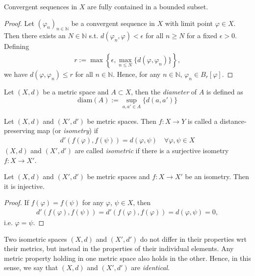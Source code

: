 \begin{theorem}
	Convergent sequences in $X$ are fully contained in a bounded subset.
\end{theorem}

\begin{proof}
	Let $(\varphi_n)_{n\in\mathbb N}$ be a convergent sequence in $X$ with limit point $\varphi\in X$. Then there exists an $N\in\mathbb N$ s.t. $d(\varphi_n, \varphi) < \epsilon$ for all $n\geq N$ for a fixed $\epsilon > 0$. Defining
	\begin{align}
		r := \max \left\{ \epsilon, \max_{n \leq N}\{d(\varphi, \varphi_n)\} \right\},
	\end{align}
	we have $d(\varphi, \varphi_n) \leq r$ for all $n\in\mathbb N$. Hence, for any $n\in\mathbb N$, 
	$\varphi_n\in B_{r}[\varphi]$.
\end{proof}

\begin{defn}\label{defn:diameter_metric_set}
	Let $(X, d)$ be a metric space and $A\subset X$, then the \textit{diameter} of $A$ is defined as
	$$\text{diam}(A) := \sup_{a, a'\in A}\{d(a, a')\}$$
\end{defn}

\begin{defn}[Isometry]
	Let $(X, d)$ and $(X', d')$ be metric spaces. Then $f: X \rightarrow Y$ is called a distance-preserving map (or \textit{isometry}) if
	\begin{align}
		d'(f(\varphi), f(\psi)) = d(\varphi, \psi) \quad\forall \varphi, \psi\in X
	\end{align}
	$(X, d)$ and $(X', d')$ are called \textit{isometric} if there is a surjective isometry $f:X\rightarrow X'$.
\end{defn}

\begin{theorem}\label{thrm:isometries_injective}
	Let $(X, d)$ and $(X', d')$ be metric spaces and $f: X\rightarrow X'$  be an isometry. Then it is injective.
\end{theorem}

\begin{proof}
	If $f(\varphi) = f(\psi)$ for any $\varphi$, $\psi\in X$, then 
	\begin{align}
		d'(f(\varphi), f(\psi)) = d'(f(\varphi), f(\varphi)) = d(\varphi, \psi) = 0, 
	\end{align}
	i.e. $\varphi = \psi$.
\end{proof}

\begin{remark}
	Two isometric spaces $(X, d)$ and $(X', d')$ do not differ in their properties wrt their metrics, but instead in the properties of their individual elements. Any metric property holding in one metric space also holds in the other. Hence, in this sense, we say that $(X, d)$ and $(X', d')$ are \textit{identical}.
\end{remark}

